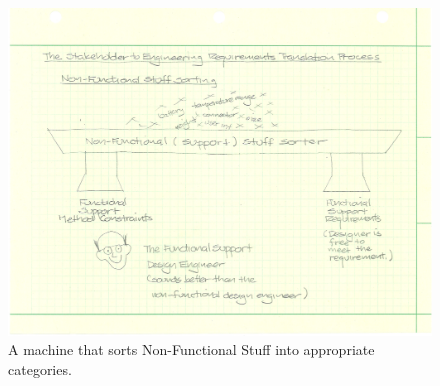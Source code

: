 \begin{figure}[tb]
\centering
\includegraphics[angle=0,width=15cm]{NonFunctionalSorting.pdf}
\caption{\label{fig:NonFunctionalSorting} A machine that sorts Non-Functional Stuff into appropriate categories.}
\end{figure}



